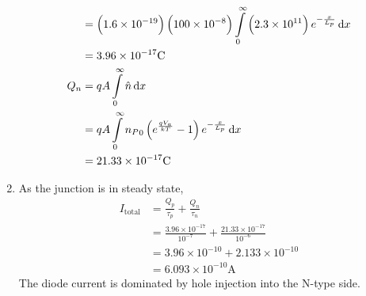 \documentclass[fleqn, a4paper, 10pt, oneside]{amsart}
\theoremstyle{definition}
\theoremstyle{theorem}
\begin{document}
\begin{solution}
\begin{enumerate}[leftmargin=*]
\begin{align*}
                                    & = \left( 1.6 \times 10^{-19} \right) \left( 100 \times 10^{-8} \right) \int\limits_{0}^{\infty} \left( 2.3 \times 10^{11} \right) e^{-\frac{x}{L_p}} \dif x \\
                                    & = 3.96 \times 10^{-17} \si{\coulomb}                                                                                                                        \\
				Q_n & = q A \int\limits_{0}^{\infty} \hat{n} \dif x                                                                                                               \\
                                    & = q A \int\limits_{0}^{\infty} {n_P}_0 \left( e^{\frac{q V_a}{k T}} - 1 \right) e^{-\frac{x}{L_p}} \dif x                                                   \\
                                    & = 21.33 \times 10^{-17} \si{\coulomb}
			\end{align*}
		\item
			As the junction is in steady state,
			\begin{align*}
				I_{\text{total}} & = \frac{Q_p}{\tau_p} + \frac{Q_n}{\tau_n}                                      \\
                                                 & = \frac{3.96 \times 10^{-17}}{10^{-7}} + \frac{21.33 \times 10^{-17}}{10^{-6}} \\
                                                 & = 3.96 \times 10^{-10} + 2.133 \times 10^{-10}                                 \\
                                                 & = 6.093 \times 10^{-10} \si{\ampere}
			\end{align*}
			The diode current is dominated by hole injection into the N-type side.
	\end{enumerate}
\end{solution}
\end{document}
